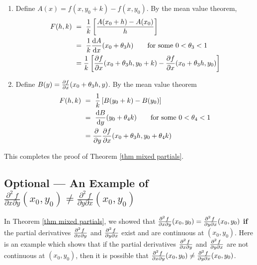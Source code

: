 \begin{enumerate}[(1)]
\item %
Define $A(x)=f(x,y_0+k)-f(x,y_0)$. By the mean value theorem,
\begin{align*}
F(h,k)\ &=\ \frac{1}{k} \left[\frac{A(x_0+h)-A(x_0)}{h}\right] \\
&=\ \frac{1}{k}\diff{A}{x}(x_0+\theta_3 h)
\qquad\text{for some $0<\theta_3<1$} \\
&=\frac{1}{k}
\left[\pdiff{f}{x}(x_0+\theta_3h,y_0+k)
-\pdiff{f}{x}(x_0+\theta_3h,y_0)\right]
\end{align*}

\item %
Define $B(y)=\pdiff{f}{x}(x_0+\theta_3h,y)$. By the mean value theorem
\begin{align*}
F(h,k)\ &=\ \frac{1}{k}\left[B(y_0+k)-B(y_0)\right] \\
&=\ \diff{B}{y}(y_0+\theta_4 k)
\qquad\text{for some $0<\theta_4<1$} \\
&=\pdiff{}{y}
\pdiff{f}{x}(x_0+\theta_3 h,y_0+\theta_4k)
\end{align*}

\end{enumerate}
This completes the proof of Theorem \ref{thm mixed partials}.

\subsection{Optional --- An Example of 
$\frac{\partial^2\ f}{\partial x\partial y}(x_0,y_0)
\ne\frac{\partial^2\ f}{\partial y\partial x}(x_0,y_0)$}
\label{subsec mixed partials counterexample}

In Theorem \ref{thm mixed partials}, we showed that
$
\frac{\partial^2\hfil f\hfil\,}{\partial x\partial y}(x_0,y_0)
=\frac{\partial^2\hfil f\hfil\,}{\partial y\partial x}(x_0,y_0)
$
\textbf{if} the partial derivatives 
$\frac{\partial^2\hfil f\hfil\,}{\partial x\partial y}$ and 
$\frac{\partial^2\hfil f\hfil\,}{\partial y\partial x}$ exist 
and are continuous at $(x_0,y_0)$. Here is an example which shows that
if the partial derivatives 
$\frac{\partial^2\hfil f\hfil\,}{\partial x\partial y}$ and 
$\frac{\partial^2\hfil f\hfil\,}{\partial y\partial x}$ 
are not continuous at $(x_0,y_0)$, then it is possible that 
$
\frac{\partial^2\hfil f\hfil\,}{\partial x\partial y}(x_0,y_0)
\ne\frac{\partial^2\hfil f\hfil\,}{\partial y\partial x}(x_0,y_0)$.


